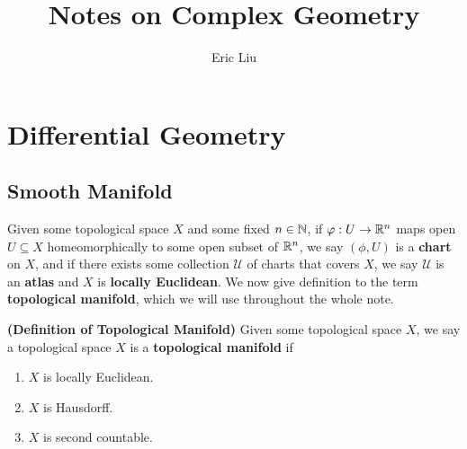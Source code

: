 \documentclass{report}
\title{Notes on Complex Geometry}
\author{Eric Liu}
\date{}
\begin{document}
\maketitle
\newpage%

\tableofcontents
\pagebreak
\chapter{Differential Geometry}
\label{Differentail Geometry}
\section{Smooth Manifold}
\begin{mdframed}
Given some topological space $X$ and some fixed $n\in\mathbb{N}$, if $\varphi:U\rightarrow \mathbb{R}^n$ maps open $U\subseteq X$ homeomorphically to some open subset of $\mathbb{R}^n$, we say  $(\phi,U)$ is a \textbf{chart} on $X$, and if there exists some collection $\mathcal{U}$ of charts that covers $X$, we say $\mathcal{U}$ is an  \textbf{atlas} and $X$ is  \textbf{locally Euclidean}.  We now give definition to the term \textbf{topological manifold}, which we will use throughout the whole note.  
\end{mdframed}
\begin{definition}
\textbf{(Definition of Topological Manifold)} Given some topological space $X$, we say a topological space $X$ is a \textbf{topological manifold} if 
\begin{enumerate}[label=(\alph*)]
  \item $X$ is locally Euclidean. 
  \item $X$ is Hausdorff. 
  \item $X$ is second countable.
\end{enumerate}
\end{definition}
\end{document}
